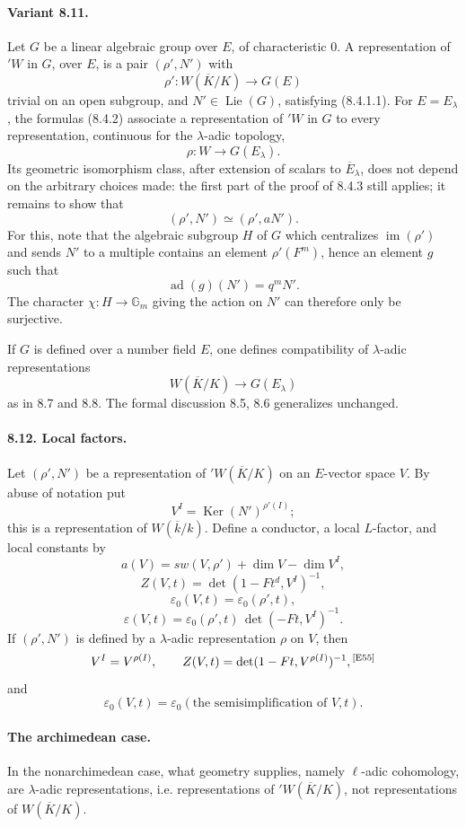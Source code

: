 \documentclass[10pt,letterpaper]{article}
\providecommand{\Ker}{\operatorname{Ker}}
\providecommand{\im}{\operatorname{im}}
\providecommand{\im}{\operatorname{im}}
\providecommand{\Lie}{\operatorname{Lie}}
\providecommand{\Lie}{\operatorname{Lie}}
\providecommand{\im}{\operatorname{im}}
\providecommand{\ad}{\operatorname{ad}}
\providecommand{\Ker}{\operatorname{Ker}}
\newcommand{\auditmark}[1]{\textsuperscript{\normalfont\scriptsize[E#1]}}
\begin{document}
\paragraph{Variant 8.11.} Let $G$ be a linear algebraic group over $E$, of characteristic $0$. A representation of ${}'W$ in $G$, over $E$, is a pair $(\rho',N')$ with
\[
\rho':W(\overline K/K)\longrightarrow G(E)
\]
trivial on an open subgroup, and $N'\in\Lie(G)$, satisfying (8.4.1.1). For $E=E_\lambda$, the formulas (8.4.2) associate a representation of ${}'W$ in $G$ to every representation, continuous for the $\lambda$-adic topology,
\[
\rho:W\longrightarrow G(E_\lambda).
\]
Its geometric isomorphism class, after extension of scalars to $\overline E_\lambda$, does not depend on the arbitrary choices made: the first part of the proof of 8.4.3 still applies; it remains to show that
\[
(\rho',N')\simeq(\rho',aN').
\]
For this, note that the algebraic subgroup $H$ of $G$ which centralizes $\im(\rho')$ and sends $N'$ to a multiple contains an element $\rho'(F^m)$, hence an element $g$ such that
\[
\ad(g)(N')=q^mN'.
\]
The character $\chi:H\to\mathbb G_m$ giving the action on $N'$ can therefore only be surjective.

If $G$ is defined over a number field $E$, one defines compatibility of $\lambda$-adic representations
\[
W(\overline K/K)\longrightarrow G(E_\lambda)
\]
as in 8.7 and 8.8. The formal discussion 8.5, 8.6 generalizes unchanged.

\paragraph{8.12. Local factors.} Let $(\rho',N')$ be a representation of ${}'W(\overline K/K)$ on an $E$-vector space $V$. By abuse of notation put
\[
V^I=\Ker(N')^{\rho'(I)};
\]
this is a representation of $W(\overline k/k)$. Define a conductor, a local $L$-factor, and local constants by
\[
\tag{8.12.1}
a(V)=sw(V,\rho')+\dim V-\dim V^I,
\]
\[
\tag{8.12.2}
Z(V,t)=\det(1-Ft^d,V^I)^{-1},
\]
\[
\tag{8.12.3}
\varepsilon_0(V,t)=\varepsilon_0(\rho',t),
\]
\[
\tag{8.12.4}
\varepsilon(V,t)=\varepsilon_0(\rho',t)\,\det(-Ft,V^I)^{-1}.
\]
If $(\rho',N')$ is defined by a $\lambda$-adic representation $\rho$ on $V$, then
\[
V^I=V^{\rho(I)},
\qquad
Z(V,t)=\det(1-Ft,V^{\rho(I)})^{-1},\auditmark{55}
\]
and
\[
\varepsilon_0(V,t)=\varepsilon_0(\text{the semisimplification of }V,t).
\]

\paragraph{The archimedean case.} In the nonarchimedean case, what geometry supplies, namely $\ell$-adic cohomology, are $\lambda$-adic representations, i.e. representations of ${}'W(\overline K/K)$, not representations of $W(\overline K/K)$.
\end{document}
